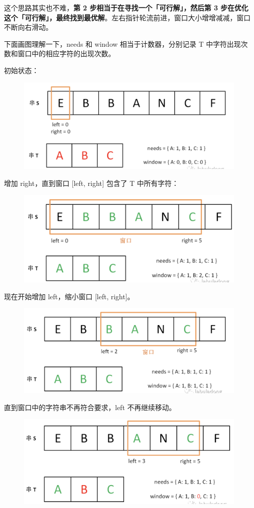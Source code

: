 \documentclass[12pt]{article}
\begin{document}
这个思路其实也不难，\textbf{第 2 步相当于在寻找一个「可行解」，然后第 3 步在优化这个「可行解」，最终找到最优解}。左右指针轮流前进，窗口大小增增减减，窗口不断向右滑动。

下面画图理解一下，needs 和 window 相当于计数器，分别记录 T 中字符出现次数和窗口中的相应字符的出现次数。

初始状态：
\begin{figure}[H]
    \centering
    \includegraphics[width=.6\textwidth]{fig/Sliding_Window_2.png}
\end{figure}

增加 right，直到窗口 [left, right] 包含了 T 中所有字符：
\begin{figure}[H]
    \centering
    \includegraphics[width=.6\textwidth]{fig/Sliding_Window_3.png}
\end{figure}

现在开始增加 left，缩小窗口 [left, right]。
\begin{figure}[H]
    \centering
    \includegraphics[width=.6\textwidth]{fig/Sliding_Window_4.png}
\end{figure}

直到窗口中的字符串不再符合要求，left 不再继续移动。
\begin{figure}[H]
    \centering
    \includegraphics[width=.6\textwidth]{fig/Sliding_Window_5.png}
\end{figure}
\end{document}
